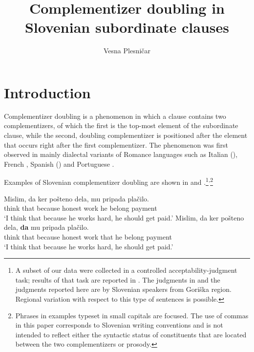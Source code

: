 \documentclass[output=paper,
]{langscibook}
\author{Vesna Plesničar\affiliation{University of Nova Gorica}}
\title{Complementizer doubling in Slovenian subordinate clauses}
\begin{document}
\maketitle

\section{Introduction} 
Complementizer doubling is a phenomenon in which a clause contains two complementizers, of which the first is the top-most element of the subordinate clause, while the second, doubling complementizer is positioned after the element that occurs right after the first complementizer. The phenomenon was first observed in mainly dialectal variants of Romance languages such as Italian (\citealt{Paoli2003, ledgeway2005, munaro2016}), French \citep{dagnac2012}, Spanish (\citealt{villa2012, GiP2014}) and Portuguese \citep{mascarenhas2007}.

Examples of Slovenian complementizer doubling are shown in  and .\footnote{A subset of our data were collected in a controlled acceptability-judgment task; results of that task are reported in \cite{plesnicar2016}. The judgments in \cite{plesnicar2016} and the judgments reported here are by Slovenian speakers from Goriška region. Regional variation with respect to this type of sentences is possible.}\textsuperscript{,}\footnote{Phrases in examples typeset in small capitals are focused. The use of commas in this paper corresponds to Slovenian writing conventions and is not intended to reflect either the syntactic status of constituents that are located between the two complementizers or prosody.}


\begin{exe}
\ex \begin{xlist}\label{ex:plesnicar:1}
\ex \label{ex:plesnicar:onea}\gll Mislim,	da	ker		pošteno	dela, 	mu	pripada plačilo.\\
	think that because	honest		work	he	belong payment \\
\trans `I think that because he works hard, he should get paid.'
\ex \label{ex:plesnicar:oneb}
\gll	Mislim,	da	ker		pošteno	dela,	\textbf{da}	mu 	pripada plačilo. \\
	think that	because	honest	work	that	he	belong payment \\
\trans `I think that because he works hard, he should get paid.'
\end{xlist}\end{exe}
\end{document}
